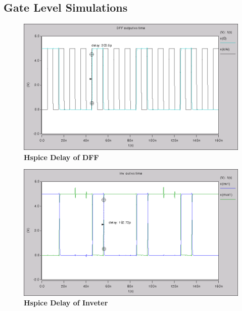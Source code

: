 \documentclass[a4paper]{article}
\begin{document}
\subsection{\textbf{Gate Level Simulations}}
    \begin{figure}[H]
        \centering
        \includegraphics[width=\textwidth,height=\textheight,keepaspectratio]{../../cscope/dff_delay.png}
        \caption{\textbf{Hspice Delay of DFF}}
        \label{fig:gg}
    \end{figure}
    \begin{figure}[H]
        \centering
        \includegraphics[width=\textwidth,height=\textheight,keepaspectratio]{../../cscope/inv1_delay.png}
        \caption{\textbf{Hspice Delay of Inveter}}
        \label{fig:gg}
    \end{figure}
\end{document}
